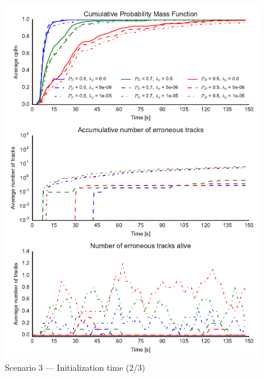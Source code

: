 \begin{figure}
\centering
\includegraphics{Figures/plots/Scenario3_Init-Time(2-3).pdf}
\caption{Scenario 3 --- Initialization time (2/3)}\label{fig:init3_time_2-3}
\end{figure}

